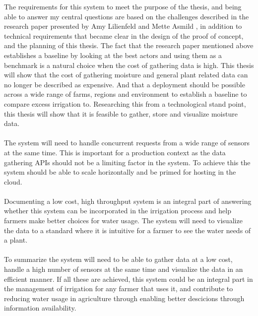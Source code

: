 \documentclass[]{uiophd}
\begin{document}
The requirements for this system to meet the purpose of the thesis, and being able to answer my central questions are based on the challenges described in the research paper presented by Amy Lilienfeld and Mette Asmild \cite{LILIENFELD200773}, in addition to technical requirements that became clear in the design of the proof of concept, and the planning of this thesis. The fact that the research paper mentioned above establishes a baseline by looking at the best actors and using them as a benchmark is a natural choice when the cost of gathering data is high. This thesis will show that the cost of gathering moisture and general plant related data can no longer be described as expensive. And that a deployment should be possible across a wide range of farms, regions and environment to establish a baseline to compare excess irrigation to. Researching this from a technological stand point, this thesis will show that it is feasible to gather, store and visualize moisture data.
\\\\
The system will need to handle concurrent requests from a wide range of sensors at the same time. This is important for a production context as the data gathering APIs should not be a limiting factor in the system. To achieve this the system should be able to scale horizontally and be primed for hosting in the cloud.
\\\\
Documenting a low cost, high throughput system is an integral part of answering whether this system can be incorporated in the irrigation process and help farmers make better choices for water usage. The system will need to visualize the data to a standard where it is intuitive for a farmer to see the water needs of a plant.
\\\\
To summarize the system will need to be able to gather data at a low cost, handle a high number of sensors at the same time and visualize the data in an efficient manner. If all these are achieved, this system could be an integral part in the management of irrigation for any farmer that uses it, and contribute to reducing water usage in agriculture through enabling better descicions through information availability.
\end{document}

